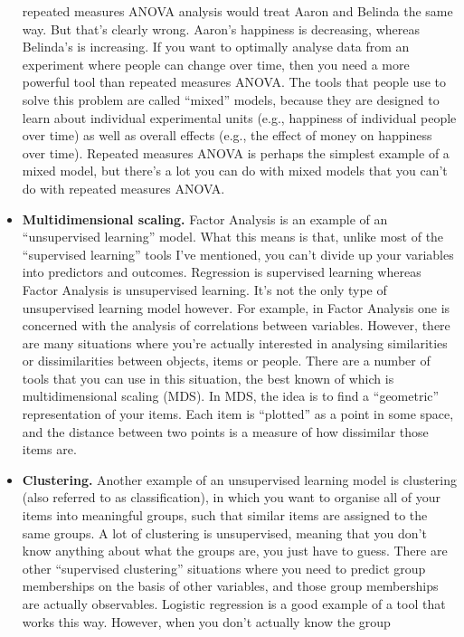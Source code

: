\documentclass[
  a4paper,
]{book}
\begin{document}
\begin{itemize}
  repeated measures ANOVA analysis would treat Aaron and Belinda the
  same way. But that's clearly wrong. Aaron's happiness is decreasing,
  whereas Belinda's is increasing. If you want to optimally analyse data
  from an experiment where people can change over time, then you need a
  more powerful tool than repeated measures ANOVA. The tools that people
  use to solve this problem are called ``mixed'' models, because they
  are designed to learn about individual experimental units (e.g.,
  happiness of individual people over time) as well as overall effects
  (e.g., the effect of money on happiness over time). Repeated measures
  ANOVA is perhaps the simplest example of a mixed model, but there's a
  lot you can do with mixed models that you can't do with repeated
  measures ANOVA.
\item
  \textbf{Multidimensional scaling.} Factor Analysis is an example of an
  ``unsupervised learning'' model. What this means is that, unlike most
  of the ``supervised learning'' tools I've mentioned, you can't divide
  up your variables into predictors and outcomes. Regression is
  supervised learning whereas Factor Analysis is unsupervised learning.
  It's not the only type of unsupervised learning model however. For
  example, in Factor Analysis one is concerned with the analysis of
  correlations between variables. However, there are many situations
  where you're actually interested in analysing similarities or
  dissimilarities between objects, items or people. There are a number
  of tools that you can use in this situation, the best known of which
  is multidimensional scaling (MDS). In MDS, the idea is to find a
  ``geometric'' representation of your items. Each item is ``plotted''
  as a point in some space, and the distance between two points is a
  measure of how dissimilar those items are.
\item
  \textbf{Clustering.} Another example of an unsupervised learning model
  is clustering (also referred to as classification), in which you want
  to organise all of your items into meaningful groups, such that
  similar items are assigned to the same groups. A lot of clustering is
  unsupervised, meaning that you don't know anything about what the
  groups are, you just have to guess. There are other ``supervised
  clustering'' situations where you need to predict group memberships on
  the basis of other variables, and those group memberships are actually
  observables. Logistic regression is a good example of a tool that
  works this way. However, when you don't actually know the group

\end{itemize}
\end{document}
